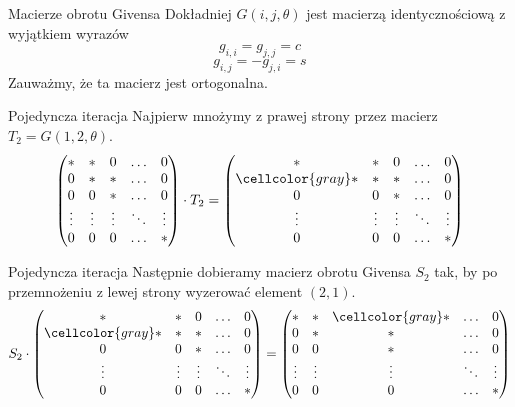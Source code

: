 \documentclass{beamer}
\newcommand{\szary}{\cellcolor{gray}}
\begin{document}
\begin{frame}{Macierze obrotu Givensa}
Dokładniej $G(i,j,\theta)$ jest macierzą identycznościową z wyjątkiem wyrazów
$$ g_{i,i} = g_{j,j} = c $$
$$ g_{i,j} = -g_{j,i} = s $$
Zauważmy, że ta macierz jest ortogonalna. 
\end{frame}

\begin{frame}{Pojedyncza iteracja}
Najpierw mnożymy z prawej strony przez macierz $T_2 = G(1,2, \theta)$.
    $$ \begin{pmatrix}
\ast & \ast & 0 & \ldots & 0 \\
0 & \ast & \ast & \ldots & 0 \\
0 & 0 & \ast & \ldots & 0 \\
\vdots & \vdots & \vdots & \ddots & \vdots \\
0 & 0 & 0 & \ldots & \ast 
\end{pmatrix} \cdot T_2 = \begin{pmatrix}
\ast & \ast & 0 & \ldots & 0 \\
\szary \ast & \ast & \ast & \ldots & 0 \\
0 & 0 & \ast & \ldots & 0 \\
\vdots & \vdots & \vdots & \ddots & \vdots \\
0 & 0 & 0 & \ldots & \ast 
\end{pmatrix} $$
\end{frame}

\begin{frame}{Pojedyncza iteracja}
Następnie dobieramy macierz obrotu Givensa $S_2$ tak, by po przemnożeniu z lewej strony wyzerować element $(2,1)$.
$$ S_2 \cdot \begin{pmatrix}
\ast & \ast & 0 & \ldots & 0 \\
\szary \ast & \ast & \ast & \ldots & 0 \\
0 & 0 & \ast & \ldots & 0 \\
\vdots & \vdots & \vdots & \ddots & \vdots \\
0 & 0 & 0 & \ldots & \ast 
\end{pmatrix} =
\begin{pmatrix}
\ast & \ast & \szary \ast & \ldots & 0 \\
0 & \ast & \ast & \ldots & 0 \\
0 & 0 & \ast & \ldots & 0 \\
\vdots & \vdots & \vdots & \ddots & \vdots \\
0 & 0 & 0 & \ldots & \ast 
\end{pmatrix}$$

\end{frame}
\end{document}
